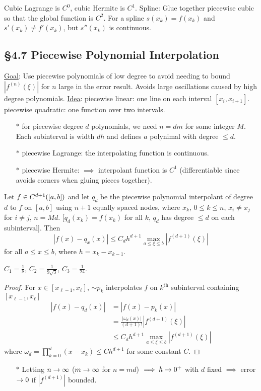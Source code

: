 \documentclass[]{article}
\begin{document}
Cubic Lagrange is $C^0$, cubic Hermite is $C^1$.
Spline: Glue together piecewise cubic so that the global function is $C^2$.
For a spline $s(x_k) = f(x_k)$ and $s'(x_k)\neq f'(x_k)$, but $s''(x_k)$ is continuous.

\subsection*{\S4.7 Piecewise Polynomial Interpolation}

\ul{Goal}: Use piecewise polynomials of low degree to avoid needing to bound $|f^{(n)}(\xi)|$ for $n$ large in the error result.
Avoids large oscillations caused by high degree polynomials.
\ul{Idea}: piecewise linear: one line on each interval $[x_i,x_{i+1}]$.
piecewise quadratic: one function over two intervals.

\begin{enumerate}
	\item[$*$] for piecewise degree $d$ polynomials, we need $n=dm$ for some integer $M$.
		Each subinterval is width $dh$ and defines $a$ polynimal with degree $\leq d$.
	\item[$*$] piecewise Lagrange: the interpolating function is continuous.
	\item[$*$] piecewise Hermite: $\implies$ interpolant function is $C^1$ (differentiable since avoids corners when gluing pieces together).
\end{enumerate}

\begin{theorem}
	Let $f\in C^{d+1}({[}a,b{]})$ and let $q_d$ be the piecewise polynomial interpolant of degree $d$ to $f$ on $[a,b]$ using $n+1$ equally spaced nodes, where $x_k$, $0\leq k\leq n$, $x_i\neq x_j$ for $i\neq j$, $n=Md$.
	[$q_d(x_k) = f(x_k)$ for all $k$, $q_d$ has degree $\leq d$ on each subinterval].
	Then $$ |f(x)-q_x(x)| \leq C_d h^{d+1} \max_{a\leq\xi\leq b}|f^{(d+1)}(\xi)| $$
	for all $a\leq x\leq b$, where $h=x_k-x_{k-1}$.
\end{theorem}
\begin{fact}
	$C_1 = \frac18$, $C_2 = \frac1{9\sqrt3}$, $C_3 = \frac1{24}$.
\end{fact}
\begin{proof}
	For $x\in[x_{\ell-1},x_\ell]$, $\sim p_k$ interpolates $f$ on $k^\text{th}$ subinterval containing $[x_{\ell-1},x_\ell]$ 
	\begin{align*}
		|f(x)-q_d(x)| &= |f(x)-p_k(x)| \\
					  &= \frac{|\omega_d(x)|}{(d+1)!}|f^{(d+1)}(\xi)| \\
					  &\leq C_d h^{d+1} \max_{a\leq\xi\leq b} |f^{(d+1)}(\xi)|
	\end{align*}
	where $\omega_d = \prod_{k=0}^d(x-x_k) \leq Ch^{d+1}$ for some constant $C$.
\end{proof}
\begin{enumerate}
	\item[$*$] Letting $n\rightarrow\infty$ ($m\rightarrow\infty$ for $n=md$)
		$\implies h\rightarrow0^+$ with $d$ fixed
		$\implies$ error $\rightarrow0$ if $|f^{(d+1)}|$ bounded.
\end{enumerate}
\end{document}
